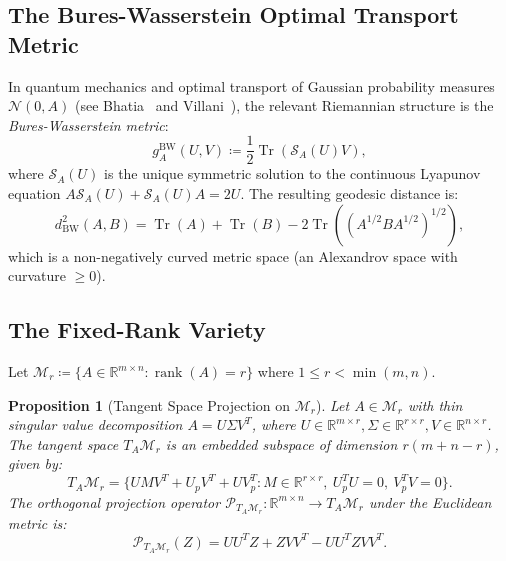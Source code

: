 \documentclass[11pt,a4paper,reqno]{amsart}
\newtheorem{proposition}[theorem]{Proposition}
\theoremstyle{definition}
\numberwithin{equation}{section}
\providecommand{\R}{\mathbb{R}}
\newcommand{\Tr}{\operatorname{Tr}}
\newcommand{\rank}{\operatorname{rank}}
\providecommand{\R}{\mathbb{R}}
\begin{document}
\subsection{The Bures-Wasserstein Optimal Transport Metric}
In quantum mechanics and optimal transport of Gaussian probability measures $\mathcal{N}(0, A)$ (see Bhatia~\cite{bhatia2009positive} and Villani~\cite{villani2009optimal}), the relevant Riemannian structure is the \emph{Bures-Wasserstein metric}:
\begin{equation}
    \label{eq:bures_metric}
    g_A^{\mathrm{BW}}(U, V) \coloneqq \frac{1}{2} \Tr(\mathcal{S}_A(U) V),
\end{equation}
where $\mathcal{S}_A(U)$ is the unique symmetric solution to the continuous Lyapunov equation $A \mathcal{S}_A(U) + \mathcal{S}_A(U) A = 2 U$. The resulting geodesic distance is:
\begin{equation}
    d_{\mathrm{BW}}^2(A, B) = \Tr(A) + \Tr(B) - 2 \Tr\left((A^{1/2} B A^{1/2})^{1/2}\right),
\end{equation}
which is a non-negatively curved metric space (an Alexandrov space with curvature $\ge 0$).

\subsection{The Fixed-Rank Variety}
\label{subsec:fixed_rank}
Let $\mathcal{M}_r \coloneqq \{A \in \R^{m \times n} \colon \rank(A) = r\}$ where $1 \le r < \min(m, n)$.

\begin{proposition}[Tangent Space Projection on $\mathcal{M}_r$]
\label{prop:tangent_proj_mr}
Let $A \in \mathcal{M}_r$ with thin singular value decomposition $A = U \Sigma V^T$, where $U \in \R^{m \times r}, \Sigma \in \R^{r \times r}, V \in \R^{n \times r}$. The tangent space $T_A \mathcal{M}_r$ is an embedded subspace of dimension $r(m + n - r)$, given by:
\begin{equation}
    T_A \mathcal{M}_r = \{ U M V^T + U_p V^T + U V_p^T \colon M \in \R^{r \times r}, \ U_p^T U = 0, \ V_p^T V = 0 \}.
\end{equation}
The orthogonal projection operator $\mathcal{P}_{T_A \mathcal{M}_r} \colon \R^{m \times n} \to T_A \mathcal{M}_r$ under the Euclidean metric is:
\begin{equation}
    \label{eq:tangent_proj_formula}
    \mathcal{P}_{T_A \mathcal{M}_r}(Z) = U U^T Z + Z V V^T - U U^T Z V V^T.
\end{equation}
\end{proposition}
\end{document}
